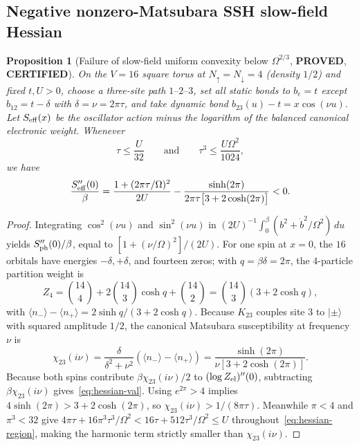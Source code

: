 \documentclass[11pt]{article}
\newtheorem{proposition}{Proposition}
\theoremstyle{remark}
\newcommand{\proved}{\textbf{PROVED}}
\newcommand{\certified}{\textbf{CERTIFIED}}
\begin{document}
\subsection{Negative nonzero-Matsubara SSH slow-field Hessian}

\begin{proposition}[Failure of slow-field uniform convexity below $\Omega^{2/3}$, \proved, \certified]\label{prop:hessian}
On the $V=16$ square torus at $N_\uparrow=N_\downarrow=4$ (density $1/2$) and fixed $t,U>0$, choose a three-site path $1\text{--}2\text{--}3$, set all static bonds to $b_e=t$ except $b_{12}=t-\delta$ with $\delta=\nu=2\pi\tau$, and take dynamic bond $b_{23}(u)-t=x\cos(\nu u)$. Let $S_{\rm eff}(x)$ be the oscillator action minus the logarithm of the balanced canonical electronic weight. Whenever
\begin{equation}\label{eq:hessian-region}
 \tau\le \frac{U}{32}\qquad\text{and}\qquad \tau^3\le \frac{U\Omega^2}{1024},
\end{equation}
we have
\begin{equation}\label{eq:hessian-val}
 \frac{S_{\rm eff}''(0)}{\beta}=\frac{1+(2\pi\tau/\Omega)^2}{2U}-\frac{\sinh(2\pi)}{2\pi\tau\bigl[3+2\cosh(2\pi)\bigr]} < 0.
\end{equation}
\end{proposition}

\begin{proof}
Integrating $\cos^2(\nu u)$ and $\sin^2(\nu u)$ in $(2U)^{-1}\int_0^\beta (b^2+\dot b^2/\Omega^2)\,du$ yields $S_{\rm ph}''(0)/\beta$, equal to $[1+(\nu/\Omega)^2]/(2U)$. For one spin at $x=0$, the $16$ orbitals have energies $-\delta,+\delta$, and fourteen zeros; with $q=\beta\delta=2\pi$, the $4$-particle partition weight is
\[
 Z_4=\binom{14}{4}+2\binom{14}{3}\cosh q+\binom{14}{2}=\binom{14}{3}(3+2\cosh q),
\]
with $\langle n_-\rangle-\langle n_+\rangle=2\sinh q/(3+2\cosh q)$. Because $K_{23}$ couples site $3$ to $|\pm\rangle$ with squared amplitude $1/2$, the canonical Matsubara susceptibility at frequency $\nu$ is
\[
 \chi_{23}(i\nu)=\frac{\delta}{\delta^2+\nu^2}(\langle n_-\rangle-\langle n_+\rangle)=\frac{\sinh(2\pi)}{\nu[3+2\cosh(2\pi)]}.
\]
Because both spins contribute $\beta\chi_{23}(i\nu)/2$ to $(\log Z_{\rm el})''(0)$, subtracting $\beta\chi_{23}(i\nu)$ gives~\eqref{eq:hessian-val}. Using $e^{2\pi}>4$ implies $4\sinh(2\pi)>3+2\cosh(2\pi)$, so $\chi_{23}(i\nu)>1/(8\pi\tau)$. Meanwhile $\pi<4$ and $\pi^3<32$ give $4\pi\tau+16\pi^3\tau^3/\Omega^2<16\tau+512\tau^3/\Omega^2\le U$ throughout~\eqref{eq:hessian-region}, making the harmonic term strictly smaller than $\chi_{23}(i\nu)$.
\end{proof}
\end{document}
